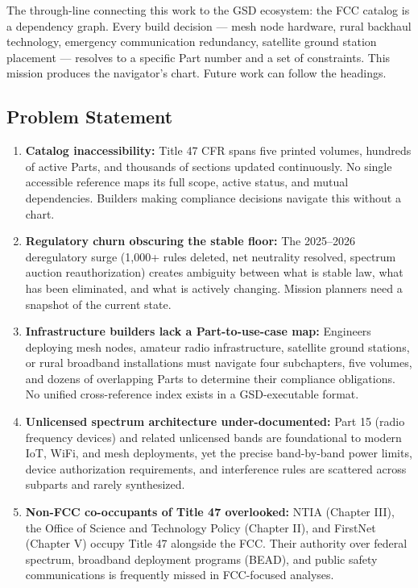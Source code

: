 \documentclass[11pt,letterpaper]{article}
\begin{document}
The through-line connecting this work to the GSD ecosystem: the FCC catalog is a dependency graph. Every build decision --- mesh node hardware, rural backhaul technology, emergency communication redundancy, satellite ground station placement --- resolves to a specific Part number and a set of constraints. This mission produces the navigator's chart. Future work can follow the headings.

\subsection{Problem Statement}

\begin{enumerate}
  \item \textbf{Catalog inaccessibility:} Title 47 CFR spans five printed volumes, hundreds of active Parts, and thousands of sections updated continuously. No single accessible reference maps its full scope, active status, and mutual dependencies. Builders making compliance decisions navigate this without a chart.

  \item \textbf{Regulatory churn obscuring the stable floor:} The 2025--2026 deregulatory surge (1,000+ rules deleted, net neutrality resolved, spectrum auction reauthorization) creates ambiguity between what is stable law, what has been eliminated, and what is actively changing. Mission planners need a snapshot of the current state.

  \item \textbf{Infrastructure builders lack a Part-to-use-case map:} Engineers deploying mesh nodes, amateur radio infrastructure, satellite ground stations, or rural broadband installations must navigate four subchapters, five volumes, and dozens of overlapping Parts to determine their compliance obligations. No unified cross-reference index exists in a GSD-executable format.

  \item \textbf{Unlicensed spectrum architecture under-documented:} Part 15 (radio frequency devices) and related unlicensed bands are foundational to modern IoT, WiFi, and mesh deployments, yet the precise band-by-band power limits, device authorization requirements, and interference rules are scattered across subparts and rarely synthesized.

  \item \textbf{Non-FCC co-occupants of Title 47 overlooked:} NTIA (Chapter III), the Office of Science and Technology Policy (Chapter II), and FirstNet (Chapter V) occupy Title 47 alongside the FCC. Their authority over federal spectrum, broadband deployment programs (BEAD), and public safety communications is frequently missed in FCC-focused analyses.
\end{enumerate}
\end{document}

